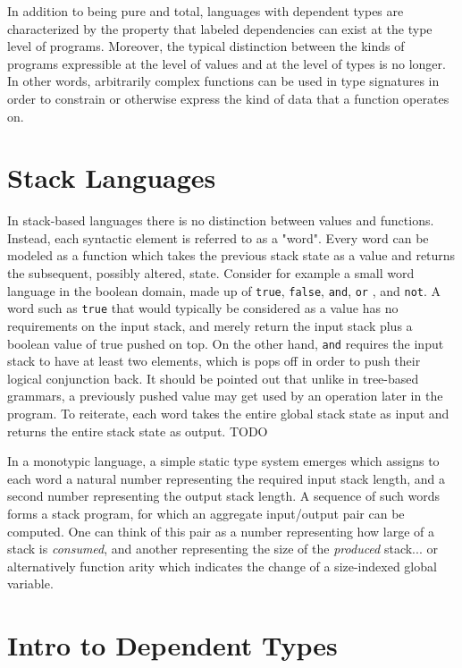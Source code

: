 \documentclass{acm_proc_article-sp}
\begin{document}
In addition to being pure and total, languages with dependent types
are characterized by the property that labeled dependencies can exist
at the type level of programs. Moreover, the typical distinction
between the kinds of programs expressible at the level of values and
at the level of types is no longer. In other words, arbitrarily
complex functions can be used in type signatures in order to constrain
or otherwise express the kind of data that a function operates on.

\section{Stack Languages}

In stack-based languages \cite{kelly:forth} there is no
distinction between values and functions. Instead, each syntactic
element is referred to as a "word". Every word can be modeled as a
function which takes the previous stack state as a value and returns
the subsequent, possibly altered, state. Consider for example a
small word language in the boolean domain, made up of \texttt{true},
\texttt{false}, \texttt{and}, \texttt{or} , and \texttt{not}. A word
such as \texttt{true} that would typically be considered as a value
has no requirements on the input stack, and merely return the input
stack plus a boolean value of true pushed on top. On the other
hand, \texttt{and} requires the input stack to have at least two elements,
which is pops off in order to push their logical conjunction
back. It should be pointed out that unlike in tree-based grammars, a
previously pushed value may get used by an operation later in the
program. To reiterate, each word takes the entire global stack state
as input and returns the entire stack state as output. TODO

In a monotypic language, a simple static type system emerges which
assigns to each word a natural number representing the required input
stack length, and a second number representing the output stack
length. A sequence of such words forms a stack program, for which an
aggregate input/output pair can be computed. One can think of this
pair as a number representing how large of a stack is
\textit{consumed}, and another representing the size of the
\textit{produced} stack... or alternatively function arity which
indicates the change of a size-indexed global variable.

\section{Intro to Dependent Types}
\end{document}
